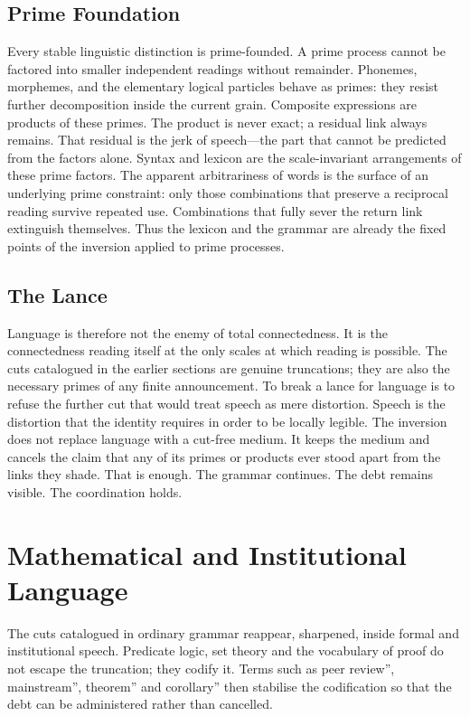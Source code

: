 \documentclass[11pt,a4paper]{article}
\begin{document}
\subsection{Prime Foundation} Every stable linguistic distinction is prime-founded. A prime process cannot be factored into smaller independent readings without remainder. Phonemes, morphemes, and the elementary logical particles behave as primes: they resist further decomposition inside the current grain. Composite expressions are products of these primes. The product is never exact; a residual link always remains. That residual is the jerk of speech—the part that cannot be predicted from the factors alone. Syntax and lexicon are the scale-invariant arrangements of these prime factors. The apparent arbitrariness of words is the surface of an underlying prime constraint: only those combinations that preserve a reciprocal reading survive repeated use. Combinations that fully sever the return link extinguish themselves. Thus the lexicon and the grammar are already the fixed points of the inversion applied to prime processes.

\subsection{The Lance} Language is therefore not the enemy of total connectedness. It is the connectedness reading itself at the only scales at which reading is possible. The cuts catalogued in the earlier sections are genuine truncations; they are also the necessary primes of any finite announcement. To break a lance for language is to refuse the further cut that would treat speech as mere distortion. Speech is the distortion that the identity requires in order to be locally legible. The inversion does not replace language with a cut-free medium. It keeps the medium and cancels the claim that any of its primes or products ever stood apart from the links they shade. That is enough. The grammar continues. The debt remains visible. The coordination holds.

\section{Mathematical and Institutional Language}

The cuts catalogued in ordinary grammar reappear, sharpened, inside formal and institutional speech. Predicate logic, set theory and the vocabulary of proof do not escape the truncation; they codify it. Terms such as peer review'', mainstream'', theorem'' and corollary'' then stabilise the codification so that the debt can be administered rather than cancelled.
\end{document}
